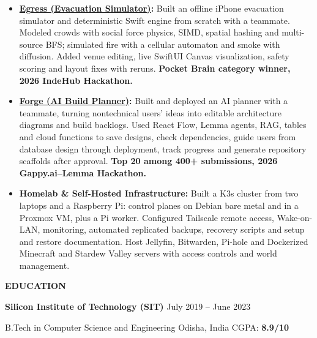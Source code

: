 \documentclass[letterpaper,10pt]{article}
\newcommand{\ressection}[1]{%
    \par\addvspace{4pt}%
    \Needspace{3\baselineskip}%
    {\fontsize{10.5pt}{11.2pt}\selectfont\bfseries #1\par}%
    \vspace{1.5pt}%
  }
\begin{document}
  \begin{itemize}
    \item \textbf{\href{https://github.com/Meenaketan7/egress-ios}
      {Egress (Evacuation Simulator)}:}
    Built an offline iPhone evacuation simulator and deterministic Swift
    engine from scratch with a teammate. Modeled crowds with social force
    physics, SIMD, spatial hashing and multi-source BFS; simulated fire
    with a cellular automaton and smoke with diffusion. Added venue editing,
    live SwiftUI Canvas visualization, safety scoring and layout fixes
    with reruns.
    \textbf{Pocket Brain category winner, 2026 IndeHub Hackathon.}

    \item \textbf{\href{https://github.com/Meenaketan7/work-flow-nodes}
      {Forge (AI Build Planner)}:}
    Built and deployed an AI planner with a teammate, turning nontechnical
    users' ideas into editable architecture diagrams and build backlogs.
    Used React Flow, Lemma agents, RAG, tables and cloud functions to save
    designs, check dependencies, guide users from database design through
    deployment, track progress and generate repository scaffolds after
    approval.
    \textbf{Top 20 among 400+ submissions, 2026 Gappy.ai--Lemma Hackathon.}

    \item \textbf{Homelab \& Self-Hosted Infrastructure:}
    Built a K3s cluster from two laptops and a Raspberry Pi: control planes
    on Debian bare metal and in a Proxmox VM, plus a Pi worker.
    Configured Tailscale remote access, Wake-on-LAN, monitoring, automated
    replicated backups, recovery scripts and setup and restore
    documentation. Host Jellyfin, Bitwarden, Pi-hole and Dockerized
    Minecraft and Stardew Valley servers with access controls and
    world management.
  \end{itemize}


  \ressection{EDUCATION}

  {\fontsize{9.2pt}{10.2pt}\selectfont
    \textbf{Silicon Institute of Technology (SIT)}
    \hfill July 2019 -- June 2023\par
    B.Tech in Computer Science and Engineering
    \hfill Odisha, India \textbar{} CGPA: \textbf{8.9/10}\par
  }

  
\end{document}
